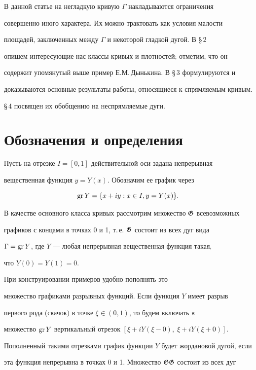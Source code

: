 В данной статье на негладкую кривую $\Gamma$ накладываются ограничения


совершенно иного характера. Их можно трактовать как условия малости


площадей, заключенных между $\Gamma$ и некоторой гладкой дугой. В \S\,2


опишем интересующие нас классы кривых и плотностей; отметим, что он


содержит упомянутый выше пример Е.М.\,Дынькина. В \S\,3 формулируются и


доказываются основные результаты работы, относящиеся к спрямляемым кривым.


\S\,4 посвящен их обобщению на неспрямляемые дуги.





\section{Обозначения и определения}





Пусть на отрезке $I=[0,1]$ действительной оси задана непрерывная


вещественная функция $y=Y(x)$. Обозначим ее график через


$$


\gr Y = \{x+iy: x\in I, y=Y(x)\}.


$$


В качестве основного класса кривых рассмотрим множество $\operatorname{\frak G}$ всевозможных


графиков с концами в точках 0 и 1, т.\,е. $\operatorname{\frak G}$ состоит из всех дуг вида


$\Gamma = \operatorname{gr} Y$, где $Y$ --- любая непрерывная вещественная функция такая,


что $Y(0) = Y(1) = 0$.





При конструировании примеров удобно пополнять это


множество графиками разрывных функций. Если функция $Y$ имеет разрыв


первого рода (скачок) в точке $\xi\in (0,1)$, то будем включать в


множество $\operatorname{gr} Y$ вертикальный отрезок $[\xi+iY(\xi-0),\; \xi+iY(\xi+0)]$.


Пополненный такими отрезками график функции $Y$ будет жордановой дугой, если


эта функция непрерывна в точках 0 и 1. Множество $\operatorname{\frak G\frak G}$ состоит из всех дуг


